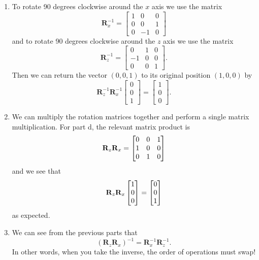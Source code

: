 \begin{sol}
\begin{enumerate}
    \item To rotate 90 degrees clockwise around the $x$ axis we use the matrix
    $$\mathbf{R}_x^{-1} = \begin{bmatrix}
    1 & 0 & 0 \\ 0 & 0 & 1 \\ 0 & -1 & 0
    \end{bmatrix}$$
    and to rotate 90 degrees clockwise around the $z$ axis we use the matrix $$\mathbf{R}_z^{-1} = \begin{bmatrix}
    0 & 1 & 0 \\ -1 & 0 & 0 \\ 0 & 0 & 1
    \end{bmatrix}.$$
    Then we can return the vector $(0,0,1)$ to its original position $(1,0,0)$ by
    $$\mathbf{R}_z^{-1}\mathbf{R}_x^{-1} \begin{bmatrix}
    0 \\ 0 \\ 1
    \end{bmatrix} = \begin{bmatrix}
    1 \\ 0 \\ 0
    \end{bmatrix}.$$
    
    \item We can multiply the rotation matrices together and perform a single matrix multiplication. For part d, the relevant matrix product is
    $$\mathbf{R}_z \mathbf{R}_x = \begin{bmatrix} 0 & 0 & 1 \\ 1 & 0 & 0 \\ 0 & 1 & 0 \end{bmatrix}$$
    and we see that
    $$\mathbf{R}_z \mathbf{R}_x \begin{bmatrix} 1 \\ 0 \\ 0 \end{bmatrix} = \begin{bmatrix} 0 \\ 0 \\ 1 \end{bmatrix}$$
    as expected. 
    
    \item We can see from the previous parts that
    $$(\mathbf{R}_z\mathbf{R}_x)^{-1} = \mathbf{R}_x^{-1}\mathbf{R}_z^{-1}.$$
    In other words, when you take the inverse, the order of operations must swap!
\end{enumerate}
\end{sol}


